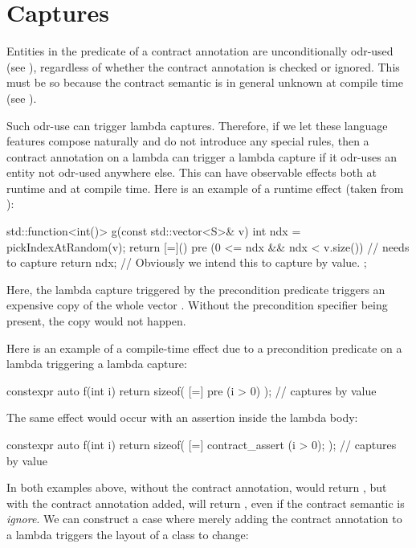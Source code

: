 \section{Captures}

Entities in the predicate of a contract annotation are unconditionally odr-used (see \cite{P2900R2}), regardless of whether the contract annotation is checked or ignored. This must be so because the contract semantic is in general unknown at compile time (see \cite{P2877R0}).

Such odr-use can trigger lambda captures. Therefore, if we let these language features compose naturally and do not introduce any special rules, then a contract annotation on a lambda can trigger a lambda capture if it odr-uses an entity not odr-used anywhere else. This can have observable effects both at runtime and at compile time. Here is an example of a runtime effect (taken from \cite{P2932R2}):

\begin{codeblock}
std::function<int()> g(const std::vector<S>& v)
{
  int ndx = pickIndexAtRandom(v);
  return [=]()
    pre (0 <= ndx && ndx < v.size()) // needs to capture 
  {
    return ndx; // Obviously we intend this to capture  by value.
  }; 
}
\end{codeblock} 

Here, the lambda capture triggered by the precondition predicate triggers an expensive copy of the whole vector . Without the precondition specifier being present, the copy would not happen. 

Here is an example of a compile-time effect due to a precondition predicate on a lambda triggering a lambda capture:

\begin{codeblock}
constexpr auto f(int i) {
  return sizeof( [=] pre (i > 0) {} );   // captures  by value
}
\end{codeblock}

The same effect would occur with an assertion inside the lambda body:

\begin{codeblock}
constexpr auto f(int i) {
  return sizeof( [=] { contract_assert (i > 0); } );   // captures  by value
}
\end{codeblock}

In both examples above, without the contract annotation,  would return , but with the contract annotation added,  will return , even if the contract semantic is \emph{ignore}. We can construct a case where merely adding the contract annotation to a lambda triggers the layout of a class to change:

